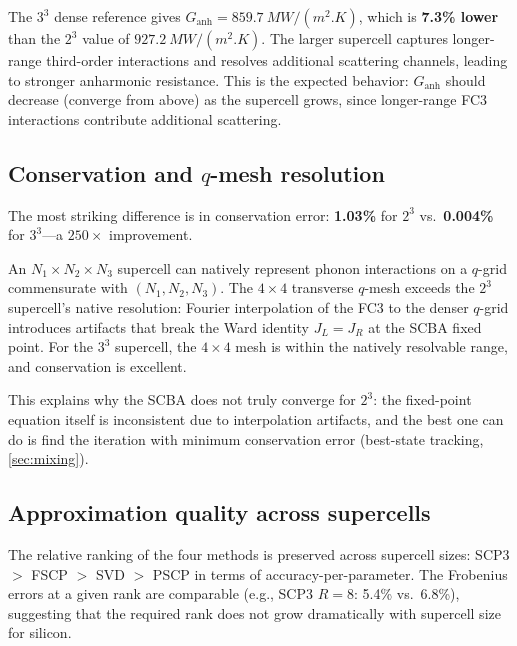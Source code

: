 \documentclass[11pt]{article}
\begin{document}
The $3^3$ dense reference gives
$G_\mathrm{anh} = \SI{859.7}{MW/(m^2.K)}$, which is \textbf{7.3\%
lower} than the $2^3$ value of $\SI{927.2}{MW/(m^2.K)}$.  The larger
supercell captures longer-range third-order interactions and resolves
additional scattering channels, leading to stronger anharmonic
resistance.  This is the expected behavior: $G_\mathrm{anh}$ should
decrease (converge from above) as the supercell grows, since
longer-range FC3 interactions contribute additional scattering.

\subsection{Conservation and $q$-mesh resolution}
\label{sec:qmesh_resolution}

The most striking difference is in conservation error: \textbf{1.03\%}
for $2^3$ vs.\ \textbf{0.004\%} for $3^3$---a $250\times$ improvement.

An $N_1\!\times\!N_2\!\times\!N_3$ supercell can natively represent
phonon interactions on a $q$-grid commensurate with
$(N_1, N_2, N_3)$.  The $4\times4$ transverse $q$-mesh exceeds the
$2^3$ supercell's native resolution: Fourier interpolation of the FC3
to the denser $q$-grid introduces artifacts that break the Ward
identity $J_L = J_R$ at the SCBA fixed point.  For the $3^3$
supercell, the $4\times4$ mesh is within the natively resolvable
range, and conservation is excellent.

This explains why the SCBA does not truly converge for $2^3$: the
fixed-point equation itself is inconsistent due to interpolation
artifacts, and the best one can do is find the iteration with minimum
conservation error (best-state tracking, \cref{sec:mixing}).

\subsection{Approximation quality across supercells}
\label{sec:approx_comparison}

The relative ranking of the four methods is preserved across supercell
sizes: SCP3 $>$ FSCP $>$ SVD $>$ PSCP in terms of
accuracy-per-parameter.  The Frobenius errors at a given rank are
comparable (e.g., SCP3 $R=8$: 5.4\% vs.\ 6.8\%), suggesting that the
required rank does not grow dramatically with supercell size for
silicon.
\end{document}
